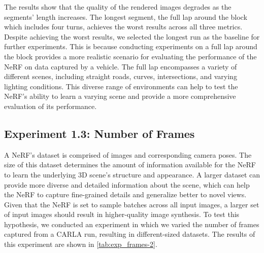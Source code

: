 The results show that the quality of the rendered images degrades as the segments' length increases. The longest segment, the full lap around the block which includes four turns, achieves the worst results across all three metrics. Despite achieving the worst results, we selected the longest run as the baseline for further experiments. This is because conducting experiments on a full lap around the block provides a more realistic scenario for evaluating the performance of the NeRF on data captured by a vehicle. The full lap encompasses a variety of different scenes, including straight roads, curves, intersections, and varying lighting conditions. This diverse range of environments can help to test the NeRF's ability to learn a varying scene and provide a more comprehensive evaluation of its performance.












\subsection{Experiment 1.3: Number of Frames} \label{sec:exp-number-of-frames}
A NeRF's dataset is comprised of images and corresponding camera poses. The size of this dataset determines the amount of information available for the NeRF to learn the underlying 3D scene's structure and appearance. A larger dataset can provide more diverse and detailed information about the scene, which can help the NeRF to capture fine-grained details and generalize better to novel views. Given that the NeRF is set to sample batches across all input images, a larger set of input images should result in higher-quality image synthesis. To test this hypothesis, we conducted an experiment in which we varied the number of frames captured from a CARLA run, resulting in different-sized datasets. The results of this experiment are shown in \autoref{tab:exp_frames-2}.

